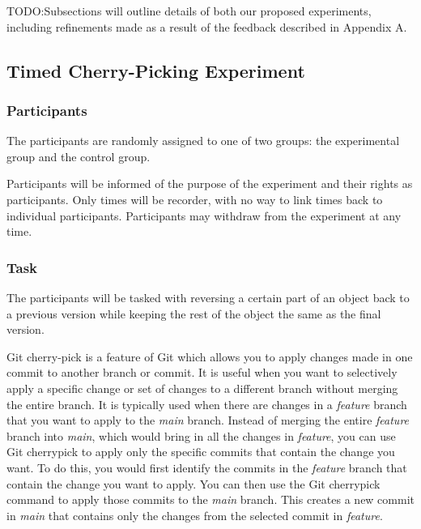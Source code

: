 \documentclass[sigconf,authorversion,nonacm]{acmart}
\begin{document}
TODO:Subsections will outline details of both our proposed experiments, including refinements made as a result of the feedback described in Appendix A.





\subsection{Timed Cherry-Picking Experiment}


\subsubsection{Participants}

The participants are randomly assigned to one of two groups: the experimental group and the control group.


Participants will be informed of the purpose of the experiment and their rights as participants.
Only times will be recorder, with no way to link times back to individual participants.
Participants may withdraw from the experiment at any time.

\subsubsection{Task}

The participants will be tasked with reversing a certain part of an object back to a previous version while keeping the rest of the object the same as the final version.

Git cherry-pick is a feature of Git which allows you to apply changes made in one commit to another branch or commit.
It is useful when you want to selectively apply a specific change or set of changes to a different branch without merging the entire branch.
It is typically used when there are changes in a \emph{feature} branch that you want to apply to the \emph{main} branch.
Instead of merging the entire \emph{feature} branch into \emph{main}, which would bring in all the changes in \emph{feature}, you can use Git cherrypick to apply only the specific commits that contain the change you want.
To do this, you would first identify the commits in the \emph{feature} branch that contain the change you want to apply.
You can then use the Git cherrypick command to apply those commits to the \emph{main} branch.
This creates a new commit in \emph{main} that contains only the changes from the selected commit in \emph{feature}.
\end{document}
